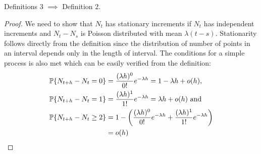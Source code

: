 \documentclass[a4paper,10pt,english]{article}
\begin{document}
\begin{thm}[] 
Definitions $3$ $\implies$ Definition $2$.
\begin{proof}
We need to show that $N_t$ has stationary increments if $N_t$  has independent increments and $N_t-N_s$ is Poisson distributed with mean $\lambda(t-s)$. Stationarity follows directly from the definition since the distribution of number of points in an interval depends only in the length of interval. The conditions for a simple process is also met which can be easily verified from the definition:
\begin{align*}
\P\{N_{t+h} - N_t=  0 \} &= \frac{(\lambda h)^0}{0!} e^{-\lambda h} = 1 - \lambda h + o(h),\\
\P\{N_{t+h} - N_t=  1 \} &= \frac{(\lambda h)^1}{1!} e^{-\lambda h} = \lambda h +o(h) \text{ and}\\
\P\{N_{t+h} - N_t \geq  2 \} &= 1- \left(\frac{(\lambda h)^0}{0!} e^{-\lambda h} + \frac{(\lambda h)^1}{1!} e^{-\lambda h}\right)\\
&= o(h)
\end{align*} 
\end{proof}
\end{thm}
\end{document}

